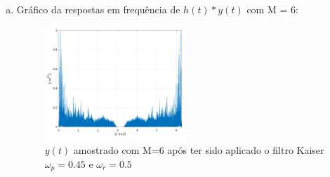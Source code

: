 \documentclass{article}
\begin{document}
\begin{enumerate}[(a)]
\item
    Gráfico da respostas em frequência de $h(t)*y(t)$ com M = 6:

    \begin{figure}[H]
    \centering
    \includegraphics[width=0.5\textwidth]{images/resamp_after_filter.png}
        \caption{$y(t)$ amostrado com M=6 após ter sido aplicado o filtro Kaiser $\omega_p = 0.45$ e $\omega_r = 0.5$}
    \end{figure}

\end{enumerate}
\end{document}
